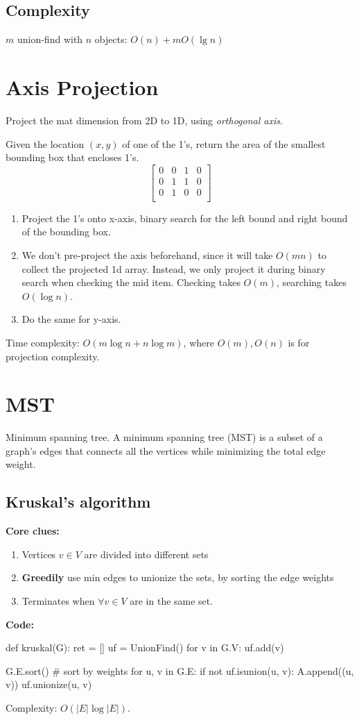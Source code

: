 \subsection{Complexity}
$m$ union-find with $n$ objects: $O(n)+m O(\lg n)$

\section{Axis Projection}
Project the mat dimension from 2D to 1D, using \textit{orthogonal axis}.

 Given the location $(x, y)$ of one of the 1's, return the area of the smallest bounding box that encloses 1's.
$$
\begin{bmatrix}
0& 0& 1& 0 \\
0& 1& 1& 0 \\
0& 1& 0& 0 \\
\end{bmatrix}
$$

\begin{enumerate}
\item Project the 1's onto x-axis, binary search for the left bound and right bound of the bounding box. 
\item We don't pre-project the axis beforehand, since it will take $O(mn)$ to collect the projected 1d array. Instead, we only project it during binary search when checking the mid item. Checking takes $O(m)$, searching takes $O(\log n)$. 
\item Do the same for y-axis.
\end{enumerate}

Time complexity: $O(m\log n + n \log m)$, where $O(m), O(n)$ is for projection complexity.
\section{MST}
Minimum spanning tree. A minimum spanning tree (MST) is a subset of a graph's edges that connects all the vertices while minimizing the total edge weight.
\subsection{Kruskal's algorithm}
\textbf{Core clues:}
\begin{enumerate}
\item Vertices $v \in V$ are divided into different sets
\item \textbf{Greedily} use min edges to unionize the sets, by sorting the edge weights
\item Terminates when $\forall v\in V$ are in the same set.
\end{enumerate}
\textbf{Code:}
\begin{python}[mathescape]
def kruskal(G):
  ret = []
  uf = UnionFind()
  for v in G.V:
    uf.add(v)

  G.E.sort()  # sort by weights
  for u, v in G.E:
    if not uf.isunion(u, v):
      A.append((u, v))
      uf.unionize(u, v)
\end{python}
Complexity: $O(|E|\log |E|)$.
